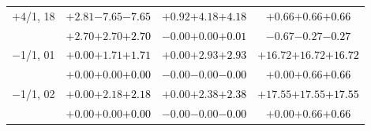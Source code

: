 \documentclass[compress]{beamer}
\begin{document}
\begin{frame}
\begin{tabular}{r | c | c | c}
$+$4/1, 18 & $+2.81$\hspace{0.1 cm}$-7.65$\hspace{0.1 cm}\textcolor{black}{$-7.65$} & $+0.92$\hspace{0.1 cm}$+4.18$\hspace{0.1 cm}\textcolor{black}{$+4.18$} & $+0.66$\hspace{0.1 cm}$+0.66$\hspace{0.1 cm}\textcolor{black}{$+0.66$} \\
           & $+2.70$\hspace{0.1 cm}$+2.70$\hspace{0.1 cm}\textcolor{black}{$+2.70$} & $-0.00$\hspace{0.1 cm}$+0.00$\hspace{0.1 cm}\textcolor{black}{$+0.01$} & $-0.67$\hspace{0.1 cm}$-0.27$\hspace{0.1 cm}\textcolor{black}{$-0.27$} \\
$-$1/1, 01 & $+0.00$\hspace{0.1 cm}$+1.71$\hspace{0.1 cm}\textcolor{black}{$+1.71$} & $+0.00$\hspace{0.1 cm}$+2.93$\hspace{0.1 cm}\textcolor{black}{$+2.93$} & $+16.72$\hspace{0.1 cm}$+16.72$\hspace{0.1 cm}\textcolor{black}{$+16.72$} \\
           & $+0.00$\hspace{0.1 cm}$+0.00$\hspace{0.1 cm}\textcolor{black}{$+0.00$} & $-0.00$\hspace{0.1 cm}$-0.00$\hspace{0.1 cm}\textcolor{black}{$-0.00$} & $+0.00$\hspace{0.1 cm}$+0.66$\hspace{0.1 cm}\textcolor{black}{$+0.66$} \\
$-$1/1, 02 & $+0.00$\hspace{0.1 cm}$+2.18$\hspace{0.1 cm}\textcolor{black}{$+2.18$} & $+0.00$\hspace{0.1 cm}$+2.38$\hspace{0.1 cm}\textcolor{black}{$+2.38$} & $+17.55$\hspace{0.1 cm}$+17.55$\hspace{0.1 cm}\textcolor{black}{$+17.55$} \\
           & $+0.00$\hspace{0.1 cm}$+0.00$\hspace{0.1 cm}\textcolor{black}{$+0.00$} & $-0.00$\hspace{0.1 cm}$-0.00$\hspace{0.1 cm}\textcolor{black}{$-0.00$} & $+0.00$\hspace{0.1 cm}$+0.66$\hspace{0.1 cm}\textcolor{black}{$+0.66$} \\

\end{tabular}
\end{frame}
\end{document}
